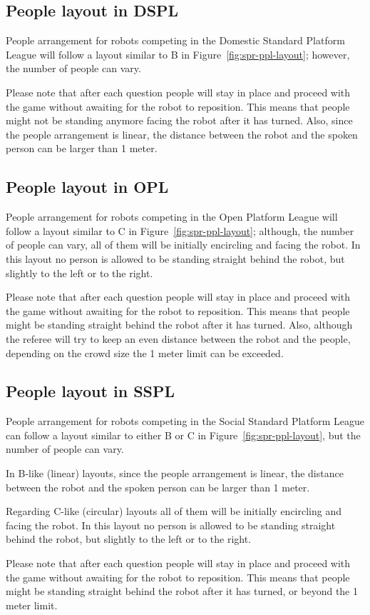 \subsection{People layout in DSPL}
People arrangement for robots competing in the Domestic Standard Platform League will follow a layout similar to B in Figure~\ref{fig:spr-ppl-layout}; however, the number of people can vary.

Please note that after each question people will stay in place and proceed with the game without awaiting for the robot to reposition. This means that people might not be standing anymore facing the robot after it has turned. Also, since the people arrangement is linear, the distance between the robot and the spoken person can be larger than 1 meter.

\subsection{People layout in OPL}
People arrangement for robots competing in the Open Platform League will follow a layout similar to C in Figure~\ref{fig:spr-ppl-layout}; although, the number of people can vary, all of them will be initially encircling and facing the robot. In this layout no person is allowed to be standing straight behind the robot, but slightly to the left or to the right.

Please note that after each question people will stay in place and proceed with the game without awaiting for the robot to reposition. This means that people might be standing straight behind the robot after it has turned. Also, although the referee will try to keep an even distance between the robot and the people, depending on the crowd size the 1 meter limit can be exceeded.

\subsection{People layout in SSPL}
People arrangement for robots competing in the Social Standard Platform League can follow a layout similar to either B or C in Figure~\ref{fig:spr-ppl-layout}, but the number of people can vary.

In B-like (linear) layouts, since the people arrangement is linear, the distance between the robot and the spoken person can be larger than 1 meter.

Regarding C-like (circular) layouts all of them will be initially encircling and facing the robot. In this layout no person is allowed to be standing straight behind the robot, but slightly to the left or to the right.

Please note that after each question people will stay in place and proceed with the game without awaiting for the robot to reposition. This means that people might be standing straight behind the robot after it has turned, or beyond the 1 meter limit.
